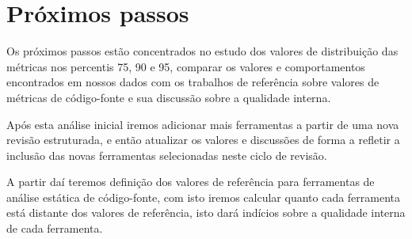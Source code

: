 %
%
%
%
%
%

\section{Próximos passos}

Os próximos passos estão concentrados no estudo dos valores de distribuição
das métricas nos percentis 75, 90 e 95, comparar os valores e comportamentos
encontrados em nossos dados com os trabalhos de referência sobre valores de
métricas de código-fonte e sua discussão sobre a qualidade interna.

Após esta análise inicial iremos adicionar mais ferramentas a partir de uma
nova revisão estruturada, e então atualizar os valores e discussões de forma a
refletir a inclusão das novas ferramentas selecionadas neste ciclo de revisão.

A partir daí teremos definição dos valores de referência para ferramentas de
análise estática de código-fonte, com isto iremos calcular quanto cada
ferramenta está distante dos valores de referência, isto dará indícios sobre a
qualidade interna de cada ferramenta.
